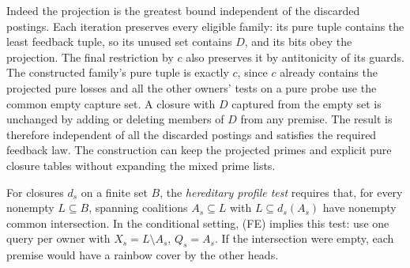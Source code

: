 Indeed the projection is the greatest bound independent
of the discarded postings. Each iteration preserves
every eligible family: its pure tuple contains the least
feedback tuple, so its unused set contains $D$, and its
bits obey the projection. The final restriction by $c$
also preserves it by antitonicity of its guards. The
constructed family's pure tuple is exactly $c$, since
$c$ already contains the projected pure losses and
all the other owners' tests on a pure probe use the
common empty capture set. A closure with $D$ captured
from the empty set is unchanged by adding or deleting
members of $D$ from any premise. The result is therefore
independent of all the discarded postings and satisfies
the required feedback law. The construction can keep
the projected primes and explicit pure closure tables
without expanding the mixed prime lists.

For closures $d_s$ on a finite set $B$, the \emph{hereditary profile
test} requires that, for every nonempty $L\subseteq B$, spanning
coalitions $A_s\subseteq L$ with $L\subseteq d_s(A_s)$ have nonempty
common intersection. In the conditional setting, (FE) implies this
test: use one query per owner with $X_s=L\setminus A_s$, $Q_s=A_s$.
If the intersection were empty, each premise would have a rainbow
cover by the other heads.

